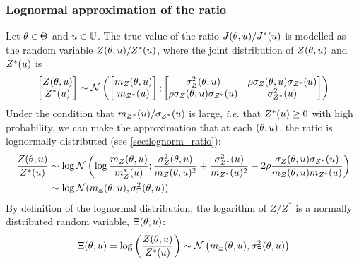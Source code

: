 \documentclass[../../Main_ManuscritThese.tex]{subfiles}
\begin{document}
\subsubsection{Lognormal approximation of the ratio}
Let $\theta\in\Theta$ and $u\in\mathbb{U}$.
The true value of the ratio $J(\theta,u)/J^*(u)$ is modelled as the random variable $Z(\theta,u)/Z^*(u)$, where the joint distribution of $Z(\theta, u)$ and $Z^*(u)$ is
\begin{equation}
  \begin{bmatrix}
    Z(\theta, u) \\ Z^*(u)
  \end{bmatrix}
  \sim \mathcal{N}\left(
    \begin{bmatrix}
      m_Z(\theta, u) \\ m_{Z^*}(u)
    \end{bmatrix}
    ;
    \begin{bmatrix}
      \sigma^2_Z(\theta, u) &\rho \sigma_Z(\theta, u)\sigma_{Z^*}(u) \\
      \rho \sigma_Z(\theta, u)\sigma_{Z^*}(u) & \sigma^2_{Z^*}(u) 
    \end{bmatrix}
  \right)
\end{equation}
Under the condition that  $m_{Z^*}(u)/\sigma_{Z^*}(u)$ is large, \textit{i.e.} that $Z^*(u) \geq 0$ with high probability, we can make the approximation that at each $(\theta, u)$, the ratio is lognormally distributed (see \cref{sec:lognorm_ratio}):
\begin{align}
  \label{eq:log_ratio_eq}
  \frac{Z(\theta, u)}{Z^*(u)}&\sim \log \mathcal{N}\left(\log\frac{m_Z(\theta, u)}{m_{Z}^*(u)};\frac{\sigma^2_Z(\theta, u)}{m_Z(\theta, u)^2}+\frac{\sigma^2_{Z^*}(u)}{m_{{Z^*}}(u)^2} -  2 \rho \frac{\sigma_Z(\theta,u) \sigma_{Z^*}(u)}{m_{Z}(\theta, u)m_{Z^*}(u)}\right) \\
  &\sim \log\mathcal{N}(m_{\Xi}(\theta, u), \sigma^2_{\Xi}(\theta, u))
\end{align}
By definition of the lognormal distribution, the logarithm of $Z/ Z^*$ is a normally distributed random variable, $\Xi(\theta, u)$:
\begin{equation}
  \label{eq:log_ratio}
  \Xi(\theta,u) =  \log\left(\frac{Z(\theta, u)}{Z^*(u)}\right)\sim \mathcal{N}\left(m_{\Xi}(\theta, u),\sigma_{\Xi}^2(\theta, u)\right)
\end{equation}
\end{document}
